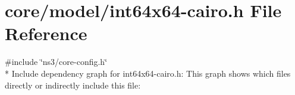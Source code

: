 \hypertarget{int64x64-cairo_8h}{}\section{core/model/int64x64-\/cairo.h File Reference}
\label{int64x64-cairo_8h}
{\ttfamily \#include \char`\"{}ns3/core-\/config.\+h\char`\"{}}\\*
Include dependency graph for int64x64-\/cairo.h\+:
This graph shows which files directly or indirectly include this file\+:
